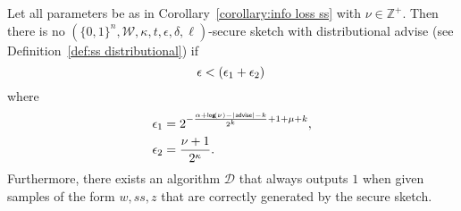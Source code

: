\begin{lemma}
\label{lem:convert distinguisher ss}
Let all parameters be as in Corollary~\ref{corollary:info loss ss} with $\nu \in\mathbb{Z}^+$.  Then there is no $(\{0,1\}^n, \mathcal{W}, \kappa, t, \epsilon, \delta, \ell)$-secure sketch with distributional advise (see Definition~\ref{def:ss distributional}) if
\[
\epsilon<\left(\epsilon_1+\epsilon_2\right)\\
\]
where 
\begin{align*}
\epsilon_1&= 2^{-\frac{\alpha+\mathsf{log}\!\left(\nu\right)-|{\mathsf{advise}}|-k}{2^k}+1+\mu+k},\\
\epsilon_2&=\frac{\nu+1}{2^{\kappa}}.
\end{align*}
Furthermore, there exists an algorithm $\mathcal{D}$ that always outputs $1$ when given samples of the form $w, ss, z$ that are correctly generated by the secure sketch.
\end{lemma}
